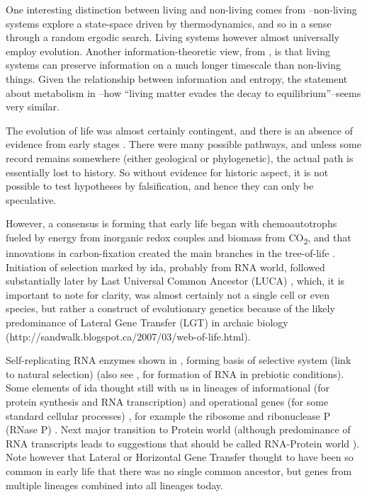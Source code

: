 One interesting distinction between living and non-living comes from \parencite{Rasmussen2004}--non-living systems explore a state-space driven by thermodynamics, and so in a sense through a random ergodic search. Living systems however almost universally employ evolution. Another information-theoretic view, from \parencite{Adami2015}, is that living systems can preserve information on a much longer timescale than non-living things. Given the relationship between information and entropy, the statement about metabolism in \cite{Schrodinger1944}--how ``living matter evades the decay to equilibrium''--seems very similar.

\begin{mdframed}[style=box, frametitle={The orgins of life}]

The evolution of life was almost certainly contingent, and there is an absence of evidence from early stages \parencite{Pross2013}. There were many possible pathways, and unless some record remains somewhere (either geological or phylogenetic), the actual path is essentially lost to history. So without evidence for historic aspect, it is not possible to test hypotheses by falsification, and hence they can only be speculative.

However, a consensus is forming that early life began with chemoautotrophs fueled by energy from inorganic redox couples and biomass from CO\textsubscript{2}, and that innovations in carbon-fixation created the main branches in the tree-of-life \parencite{Braakman2012}. Initiation of selection marked by \gls{ida}, probably from RNA world, followed substantially later by Last Universal Common Ancestor (LUCA) \parencite{Yarus2011}, which, it is important to note for clarity, was almost certainly not a single cell or even species, but rather a construct of evolutionary genetics because of the likely predominance of Lateral Gene Transfer (LGT) in archaic biology (http://sandwalk.blogspot.ca/2007/03/web-of-life.html).

Self-replicating RNA enzymes shown in \parencite{Lincoln2009}, forming basis of selective system (link to natural selection) (also see \parencite{Cheng2010}, \parencite{Powner2009} for formation of RNA in prebiotic conditions). Some elements of \gls{ida} thought still with us in lineages of informational (for protein synthesis and RNA transcription) and operational genes (for some standard cellular processes) \parencite{Ragan2009}, for example the ribosome and ribonuclease P (RNase P) \parencite{Wilson2009}. Next major transition to Protein world (although predominance of RNA transcripts leads to suggestions that should be called RNA-Protein world \parencite{Altman2013}). Note however that Lateral or Horizontal Gene Transfer thought to have been so common in early life that there was no single common ancestor, but genes from multiple lineages combined into all lineages today.\parencite{Ragan2009}


\end{mdframed}
